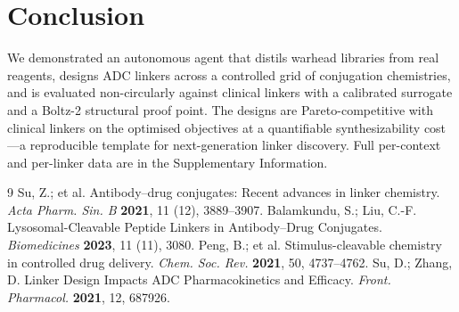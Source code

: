 \documentclass[10pt]{article}
\begin{document}
\section{Conclusion}
We demonstrated an autonomous agent that distils warhead libraries from real reagents, designs ADC linkers across a controlled grid of conjugation chemistries, and is evaluated non-circularly against clinical linkers with a calibrated surrogate and a Boltz-2 structural proof point. The designs are Pareto-competitive with clinical linkers on the optimised objectives at a quantifiable synthesizability cost---a reproducible template for next-generation linker discovery. Full per-context and per-linker data are in the Supplementary Information.
\begin{thebibliography}{9}
 Su, Z.; et al. Antibody--drug conjugates: Recent advances in linker chemistry. \emph{Acta Pharm. Sin. B} \textbf{2021}, 11 (12), 3889--3907.
 Balamkundu, S.; Liu, C.-F. Lysosomal-Cleavable Peptide Linkers in Antibody--Drug Conjugates. \emph{Biomedicines} \textbf{2023}, 11 (11), 3080.
 Peng, B.; et al. Stimulus-cleavable chemistry in controlled drug delivery. \emph{Chem. Soc. Rev.} \textbf{2021}, 50, 4737--4762.
 Su, D.; Zhang, D. Linker Design Impacts ADC Pharmacokinetics and Efficacy. \emph{Front. Pharmacol.} \textbf{2021}, 12, 687926.
\end{thebibliography}
\end{document}
